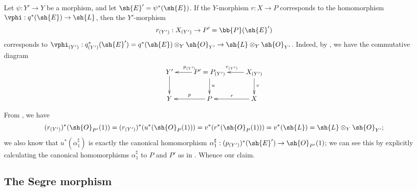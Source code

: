 \begin{env}[4.2.10]
\label{II.4.2.10}
Let $\psi:Y'\to Y$ be a morphism, and let $\sh{E}'=\psi^*(\sh{E})$.
If the $Y$-morphism $r:X\to P$ corresponds to the homomorphism $\vphi:q^*(\sh{E})\to\sh{L}$, then the $Y'$-morphism
\[
  r_{(Y')}: X_{(Y')} \to P' = \bb{P}(\sh{E}')
\]
corresponds to $\vphi_{(Y')}:q_{(Y')}^*(\sh{E}') = q^*(\sh{E})\otimes_Y\sh{O}_{Y'} \to \sh{L}\otimes_Y\sh{O}_{Y'}$.
Indeed, by , we have the commutative diagram
\[
  \xymatrix{
    Y' \ar[d]
    & P'=P_{(Y')} \ar[l]_{p_{(Y')}} \ar[d]^{u}
    & X_{(Y')} \ar[l]_{r_{(Y')}} \ar[d]^{v}
  \\Y
    & P \ar[l]_{p}
    & X \ar[l]_{r}
  }
\]

From , we have
\[
  (r_{(Y')})^*(\sh{O}_{P'}(1)) = (r_{(Y')})^*(u^*(\sh{O}_P(1))) = v^*(r^*(\sh{O}_P(1))) = v^*(\sh{L}) = \sh{L}\otimes_Y\sh{O}_{Y'};
\]
we also know that $u^*(\alpha_1^\sharp)$ is exactly the canonical homomorphism $\alpha_1^\sharp:(p_{(Y')})^*(\sh{E}')\to\sh{O}_{P'}(1)$;
we can see this by explicitly calculating the canonical homomorphisms $\alpha_1^\sharp$ to $P$ and $P'$ as in .
Whence our claim.
\end{env}


\subsection{The Segre morphism}
\label{subsection:II.4.3}

